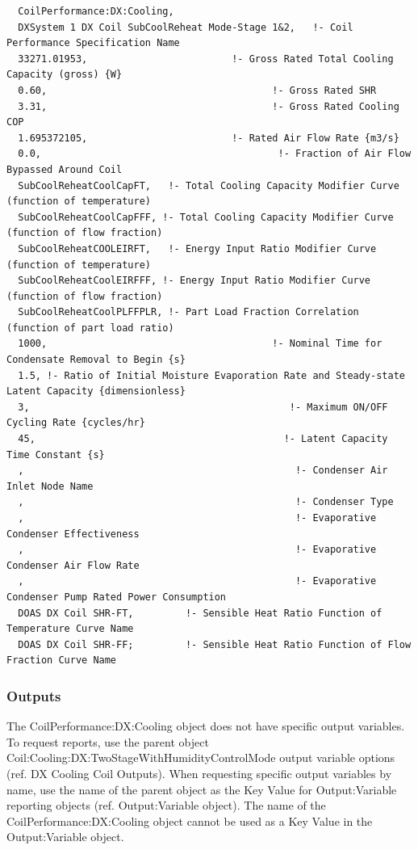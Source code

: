 \begin{lstlisting}
  CoilPerformance:DX:Cooling,
  DXSystem 1 DX Coil SubCoolReheat Mode-Stage 1&2,   !- Coil Performance Specification Name
  33271.01953,                         !- Gross Rated Total Cooling Capacity (gross) {W}
  0.60,                                       !- Gross Rated SHR
  3.31,                                       !- Gross Rated Cooling COP
  1.695372105,                         !- Rated Air Flow Rate {m3/s}
  0.0,                                         !- Fraction of Air Flow Bypassed Around Coil
  SubCoolReheatCoolCapFT,   !- Total Cooling Capacity Modifier Curve (function of temperature)
  SubCoolReheatCoolCapFFF, !- Total Cooling Capacity Modifier Curve (function of flow fraction)
  SubCoolReheatCOOLEIRFT,   !- Energy Input Ratio Modifier Curve (function of temperature)
  SubCoolReheatCoolEIRFFF, !- Energy Input Ratio Modifier Curve (function of flow fraction)
  SubCoolReheatCoolPLFFPLR, !- Part Load Fraction Correlation (function of part load ratio)
  1000,                                       !- Nominal Time for Condensate Removal to Begin {s}
  1.5, !- Ratio of Initial Moisture Evaporation Rate and Steady-state Latent Capacity {dimensionless}
  3,                                             !- Maximum ON/OFF Cycling Rate {cycles/hr}
  45,                                           !- Latent Capacity Time Constant {s}
  ,                                               !- Condenser Air Inlet Node Name
  ,                                               !- Condenser Type
  ,                                               !- Evaporative Condenser Effectiveness
  ,                                               !- Evaporative Condenser Air Flow Rate
  ,                                               !- Evaporative Condenser Pump Rated Power Consumption
  DOAS DX Coil SHR-FT,         !- Sensible Heat Ratio Function of Temperature Curve Name
  DOAS DX Coil SHR-FF;         !- Sensible Heat Ratio Function of Flow Fraction Curve Name
\end{lstlisting}

\subsubsection{Outputs}\label{outputs-14-001}

The CoilPerformance:DX:Cooling object does not have specific output variables. To request reports, use the parent object Coil:Cooling:DX:TwoStageWithHumidityControlMode output variable options (ref. DX Cooling Coil Outputs). When requesting specific output variables by name, use the name of the parent object as the Key Value for Output:Variable reporting objects (ref. Output:Variable object). The name of the CoilPerformance:DX:Cooling object cannot be used as a Key Value in the Output:Variable object.

